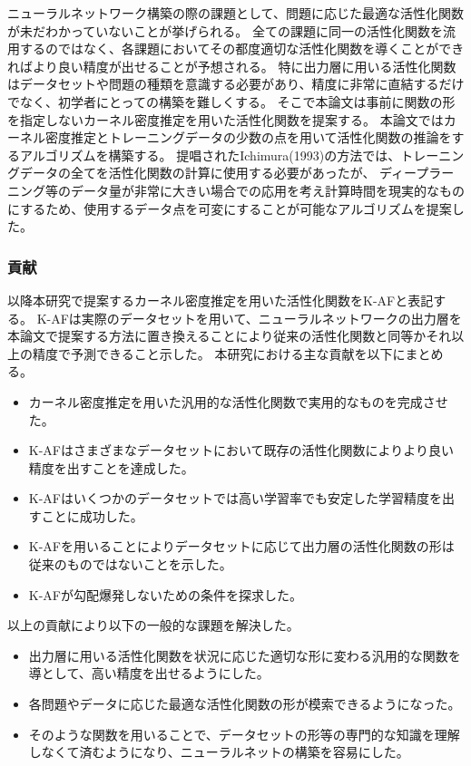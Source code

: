 ニューラルネットワーク構築の際の課題として、問題に応じた最適な活性化関数が未だわかっていないことが挙げられる。
全ての課題に同一の活性化関数を流用するのではなく、各課題においてその都度適切な活性化関数を導くことができればより良い精度が出せることが予想される。
特に出力層に用いる活性化関数はデータセットや問題の種類を意識する必要があり、精度に非常に直結するだけでなく、初学者にとっての構築を難しくする。
そこで本論文は事前に関数の形を指定しないカーネル密度推定を用いた活性化関数を提案する。
本論文ではカーネル密度推定とトレーニングデータの少数の点を用いて活性化関数の推論をするアルゴリズムを構築する。
提唱されたIchimura(1993)の方法では、トレーニングデータの全てを活性化関数の計算に使用する必要があったが、
ディープラーニング等のデータ量が非常に大きい場合での応用を考え計算時間を現実的なものにするため、使用するデータ点を可変にすることが可能なアルゴリズムを提案した。


\subsubsection{貢献}
\label{kouken}

以降本研究で提案するカーネル密度推定を用いた活性化関数をK-AFと表記する。
K-AFは実際のデータセットを用いて、ニューラルネットワークの出力層を本論文で提案する方法に置き換えることにより従来の活性化関数と同等かそれ以上の精度で予測できること示した。
本研究における主な貢献を以下にまとめる。

\begin{itemize}
  \item カーネル密度推定を用いた汎用的な活性化関数で実用的なものを完成させた。
  \item K-AFはさまざまなデータセットにおいて既存の活性化関数によりより良い精度を出すことを達成した。
  \item K-AFはいくつかのデータセットでは高い学習率でも安定した学習精度を出すことに成功した。
  \item K-AFを用いることによりデータセットに応じて出力層の活性化関数の形は従来のものではないことを示した。
  \item K-AFが勾配爆発しないための条件を探求した。
\end{itemize}

以上の貢献により以下の一般的な課題を解決した。

\begin{itemize}
  \item 出力層に用いる活性化関数を状況に応じた適切な形に変わる汎用的な関数を導として、高い精度を出せるようにした。
  \item 各問題やデータに応じた最適な活性化関数の形が模索できるようになった。
  \item そのような関数を用いることで、データセットの形等の専門的な知識を理解しなくて済むようになり、ニューラルネットの構築を容易にした。
\end{itemize}




